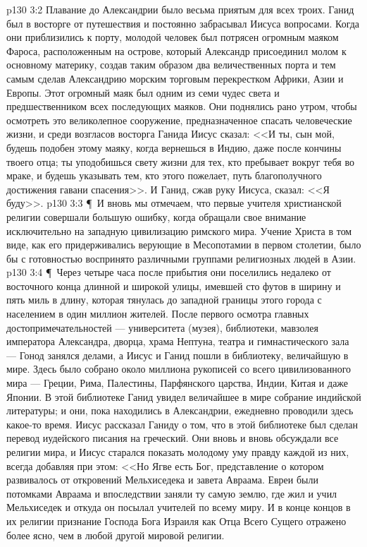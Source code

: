 \vs p130 3:2 Плавание до Александрии было весьма приятым для всех троих. Ганид был в восторге от путешествия и постоянно забрасывал Иисуса вопросами. Когда они приблизились к порту, молодой человек был потрясен огромным маяком Фароса, расположенным на острове, который Александр присоединил молом к основному материку, создав таким образом два величественных порта и тем самым сделав Александрию морским торговым перекрестком Африки, Азии и Европы. Этот огромный маяк был одним из семи чудес света и предшественником всех последующих маяков. Они поднялись рано утром, чтобы осмотреть это великолепное сооружение, предназначенное спасать человеческие жизни, и среди возгласов восторга Ганида Иисус сказал: <<И ты, сын мой, будешь подобен этому маяку, когда вернешься в Индию, даже после кончины твоего отца; ты уподобишься свету жизни для тех, кто пребывает вокруг тебя во мраке, и будешь указывать тем, кто этого пожелает, путь благополучного достижения гавани спасения>>. И Ганид, сжав руку Иисуса, сказал: <<Я буду>>.
\vs p130 3:3 \P\ И вновь мы отмечаем, что первые учителя христианской религии совершали большую ошибку, когда обращали свое внимание исключительно на западную цивилизацию римского мира. Учение Христа в том виде, как его придерживались верующие в Месопотамии в первом столетии, было бы с готовностью воспринято различными группами религиозных людей в Азии.
\vs p130 3:4 \P\ Через четыре часа после прибытия они поселились недалеко от восточного конца длинной и широкой улицы, имевшей сто футов в ширину и пять миль в длину, которая тянулась до западной границы этого города с населением в один миллион жителей. После первого осмотра главных достопримечательностей --- университета (музея), библиотеки, мавзолея императора Александра, дворца, храма Нептуна, театра и гимнастического зала --- Гонод занялся делами, а Иисус и Ганид пошли в библиотеку, величайшую в мире. Здесь было собрано около миллиона рукописей со всего цивилизованного мира --- Греции, Рима, Палестины, Парфянского царства, Индии, Китая и даже Японии. В этой библиотеке Ганид увидел величайшее в мире собрание индийской литературы; и они, пока находились в Александрии, ежедневно проводили здесь какое\hyp{}то время. Иисус рассказал Ганиду о том, что в этой библиотеке был сделан перевод иудейского писания на греческий. Они вновь и вновь обсуждали все религии мира, и Иисус старался показать молодому уму правду каждой из них, всегда добавляя при этом: <<Но Ягве есть Бог, представление о котором развивалось от откровений Мельхиседека и завета Авраама. Евреи были потомками Авраама и впоследствии заняли ту самую землю, где жил и учил Мельхиседек и откуда он посылал учителей по всему миру. И в конце концов в их религии признание Господа Бога Израиля как Отца Всего Сущего отражено более ясно, чем в любой другой мировой религии.
